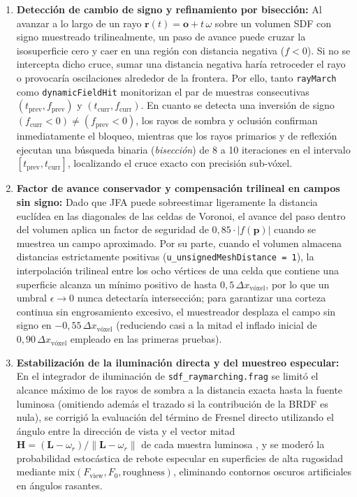 \begin{enumerate}
  \item \textbf{Detección de cambio de signo y refinamiento por bisección:} Al avanzar a lo largo de un rayo $\mathbf{r}(t) = \mathbf{o} + t\,\omega$ sobre un volumen SDF con signo muestreado trilinealmente, un paso de avance puede cruzar la isosuperficie cero y caer en una región con distancia negativa ($f < 0$). Si no se intercepta dicho cruce, sumar una distancia negativa haría retroceder el rayo o provocaría oscilaciones alrededor de la frontera. Por ello, tanto \texttt{rayMarch} como \texttt{dynamicFieldHit} monitorizan el par de muestras consecutivas $(t_{\text{prev}}, f_{\text{prev}})$ y $(t_{\text{curr}}, f_{\text{curr}})$. En cuanto se detecta una inversión de signo $(f_{\text{curr}} < 0) \neq (f_{\text{prev}} < 0)$, los rayos de sombra y oclusión confirman inmediatamente el bloqueo, mientras que los rayos primarios y de reflexión ejecutan una búsqueda binaria (\textit{bisección}) de 8 a 10 iteraciones en el intervalo $[t_{\text{prev}}, t_{\text{curr}}]$, localizando el cruce exacto con precisión sub-vóxel.
  \item \textbf{Factor de avance conservador y compensación trilineal en campos sin signo:} Dado que JFA puede sobreestimar ligeramente la distancia euclídea en las diagonales de las celdas de Voronoi, el avance del paso dentro del volumen aplica un factor de seguridad de $0,85 \cdot |f(\mathbf{p})|$ cuando se muestrea un campo aproximado. Por su parte, cuando el volumen almacena distancias estrictamente positivas (\texttt{u\_unsignedMeshDistance = 1}), la interpolación trilineal entre los ocho vértices de una celda que contiene una superficie alcanza un mínimo positivo de hasta $0,5\,\Delta x_{\text{vóxel}}$, por lo que un umbral $\epsilon \to 0$ nunca detectaría intersección; para garantizar una corteza continua sin engrosamiento excesivo, el muestreador desplaza el campo sin signo en $-0,55\,\Delta x_{\text{vóxel}}$ (reduciendo casi a la mitad el inflado inicial de $0,90\,\Delta x_{\text{vóxel}}$ empleado en las primeras pruebas).
  \item \textbf{Estabilización de la iluminación directa y del muestreo especular:} En el integrador de iluminación de \texttt{sdf\_raymarching.frag} se limitó el alcance máximo de los rayos de sombra a la distancia exacta hasta la fuente luminosa (omitiendo además el trazado si la contribución de la BRDF es nula), se corrigió la evaluación del término de Fresnel directo utilizando el ángulo entre la dirección de vista y el vector mitad $\mathbf{H} = (\mathbf{L} - \omega_r)/\|\mathbf{L} - \omega_r\|$ de cada muestra luminosa \cite{pharr2023}, y se moderó la probabilidad estocástica de rebote especular en superficies de alta rugosidad mediante $\text{mix}(F_{\text{view}}, F_0, \text{roughness})$, eliminando contornos oscuros artificiales en ángulos rasantes.

\end{enumerate}
